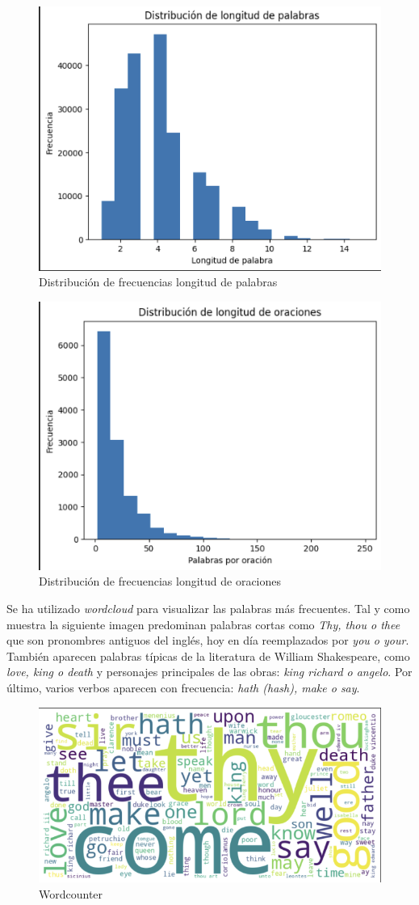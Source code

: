 \documentclass[11pt]{book}
\begin{document}
\begin{figure}[h]
    \centering
    \includegraphics[width=0.5\linewidth]{img/hist_long_w_shake.png}
    \caption{Distribución de frecuencias longitud de palabras}
    \label{fig:placeholder34}
\end{figure}

\begin{figure}[h]
    \centering
    \includegraphics[width=0.5\linewidth]{img/hist_long_s_shake.png}
    \caption{Distribución de frecuencias longitud de oraciones}
    \label{fig:placeholder35}
\end{figure}

Se ha utilizado \textit{wordcloud} para visualizar las palabras más frecuentes. Tal y como muestra la siguiente imagen predominan palabras cortas como \textit{Thy, thou o thee} que son pronombres antiguos del inglés, hoy en día reemplazados por \textit{you o your}. También aparecen palabras típicas de la literatura de William Shakespeare, como \textit{love, king o death} y personajes principales de las obras: \textit{king richard o angelo}. Por último, varios verbos aparecen con frecuencia: \textit{hath (hash), make o say}.

\begin{figure}[h]
    \centering
    \includegraphics[width=0.5\linewidth]{img/word_count_shake.png}
    \caption{Wordcounter}
    \label{fig:placeholder36}
\end{figure}
\end{document}
